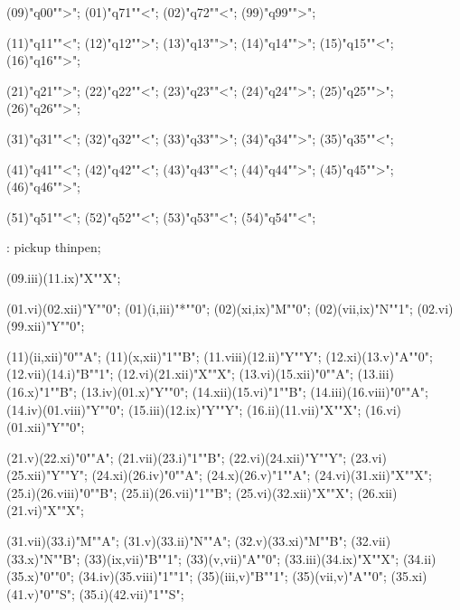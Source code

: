 \MTstate(09)"q00"">";
\MTstate(01)"q71""<";
\MTstate(02)"q72""<";
\MTstate(99)"q99"">";

\MTstate(11)"q11""<";
\MTstate(12)"q12"">";
\MTstate(13)"q13"">";
\MTstate(14)"q14"">";
\MTstate(15)"q15""<";
\MTstate(16)"q16"">";

\MTstate(21)"q21"">";
\MTstate(22)"q22""<";
\MTstate(23)"q23""<";
\MTstate(24)"q24"">";
\MTstate(25)"q25"">";
\MTstate(26)"q26"">";

\MTstate(31)"q31""<";
\MTstate(32)"q32""<";
\MTstate(33)"q33"">";
\MTstate(34)"q34"">";
\MTstate(35)"q35""<";

\MTstate(41)"q41""<";
\MTstate(42)"q42""<";
\MTstate(43)"q43""<";
\MTstate(44)"q44"">";
\MTstate(45)"q45"">";
\MTstate(46)"q46"">";

\MTstate(51)"q51""<";
\MTstate(52)"q52""<";
\MTstate(53)"q53""<";
\MTstate(54)"q54""<";

\MT: pickup thinpen;

\MTinput(09.iii)(11.ix)"X""X";

\MTinput(01.vi)(02.xii)"Y""0";
\MTauto(01)(i,iii)"*""0";
\MTauto(02)(xi,ix)"M""0";
\MTauto(02)(vii,ix)"N""1";
\MTinput(02.vi)(99.xii)"Y""0";

\MTauto(11)(ii,xii)"0""A";
\MTauto(11)(x,xii)"1""B";
\MTinput(11.viii)(12.ii)"Y""Y";
\MTinput(12.xi)(13.v)"A""0";
\MTinput(12.vii)(14.i)"B""1";
\MTinput(12.vi)(21.xii)"X""X";
\MTinput(13.vi)(15.xii)"0""A";
\MTinput(13.iii)(16.x)"1""B";
\MTinput(13.iv)(01.x)"Y""0";
\MTinput(14.xii)(15.vi)"1""B";
\MTinput(14.iii)(16.viii)"0""A";
\MTinput(14.iv)(01.viii)"Y""0";
\MTinput(15.iii)(12.ix)"Y""Y";
\MTinput(16.ii)(11.vii)"X""X";
\MTinput(16.vi)(01.xii)"Y""0";

\MTinput(21.v)(22.xi)"0""A";
\MTinput(21.vii)(23.i)"1""B";
\MTinput(22.vi)(24.xii)"Y""Y";
\MTinput(23.vi)(25.xii)"Y""Y";
\MTinput(24.xi)(26.iv)"0""A";
\MTinput(24.x)(26.v)"1""A";
\MTinput(24.vi)(31.xii)"X""X";
\MTinput(25.i)(26.viii)"0""B";
\MTinput(25.ii)(26.vii)"1""B";
\MTinput(25.vi)(32.xii)"X""X";
\MTinput(26.xii)(21.vi)"X""X";

\MTinput(31.vii)(33.i)"M""A";
\MTinput(31.v)(33.ii)"N""A";
\MTinput(32.v)(33.xi)"M""B";
\MTinput(32.vii)(33.x)"N""B";
\MTauto(33)(ix,vii)"B""1";
\MTauto(33)(v,vii)"A""0";
\MTinput(33.iii)(34.ix)"X""X";
\MTinput(34.ii)(35.x)"0""0";
\MTinput(34.iv)(35.viii)"1""1";
\MTauto(35)(iii,v)"B""1";
\MTauto(35)(vii,v)"A""0";
\MTinput(35.xi)(41.v)"0""S";
\MTinput(35.i)(42.vii)"1""S";

